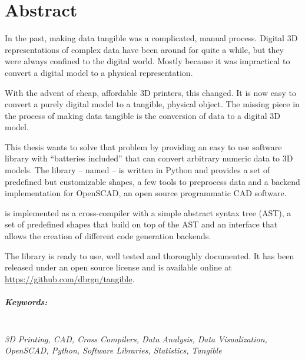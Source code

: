 

\begingroup
\let\clearpage\relax
\let\cleardoublepage\relax
\let\cleardoublepage\relax

\chapter*{Abstract} %

In the past, making data tangible was a complicated, manual process. Digital 3D
representations of complex data have been around for quite a while, but they
were always confined to the digital world. Mostly because it was impractical to
convert a digital model to a physical representation.

With the advent of cheap, affordable 3D printers, this changed. It is now easy
to convert a purely digital model to a tangible, physical object. The missing
piece in the process of making data tangible is the conversion of data to a
digital 3D model.

This thesis wants to solve that problem by providing an easy to use software
library with ``batteries included'' that can convert arbitrary numeric data to
3D models. The library -- named \tangible{} -- is written in Python and provides
a set of predefined but customizable shapes, a few tools to preprocess data and
a backend implementation for OpenSCAD, an open source programmatic CAD software.

\tangible{} is implemented as a cross-compiler with a simple abstract syntax
tree (AST), a set of predefined shapes that build on top of the AST and an
interface that allows the creation of different code generation backends.

The library is ready to use, well tested and thoroughly documented. It has been
released under an open source license and is available online at
\url{https://github.com/dbrgn/tangible}.

\endgroup			

\paragraph{Keywords:}\mbox{}\\
\textit{3D Printing, CAD, Cross Compilers, Data Analysis, Data Visualization,
OpenSCAD, Python, Software Libraries, Statistics, Tangible}

\vfill
